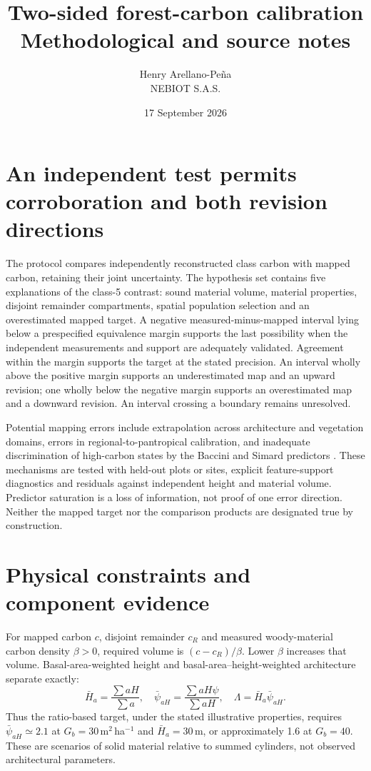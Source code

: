 \documentclass[11pt,a4paper]{article}
\title{Two-sided forest-carbon calibration\\[.4em]\large Methodological and source notes}
\author{Henry Arellano-Pe\~na\\NEBIOT S.A.S.}\date{17 September 2026}
\begin{document}
\maketitle
\section{An independent test permits corroboration and both revision directions}
The protocol compares independently reconstructed class carbon with mapped carbon, retaining their joint uncertainty. The hypothesis set contains five explanations of the class-5 contrast: sound material volume, material properties, disjoint remainder compartments, spatial population selection and an overestimated mapped target. A negative measured-minus-mapped interval lying below a prespecified equivalence margin supports the last possibility when the independent measurements and support are adequately validated. Agreement within the margin supports the target at the stated precision. An interval wholly above the positive margin supports an underestimated map and an upward revision; one wholly below the negative margin supports an overestimated map and a downward revision. An interval crossing a boundary remains unresolved.

Potential mapping errors include extrapolation across architecture and vegetation domains, errors in regional-to-pantropical calibration, and inadequate discrimination of high-carbon states by the Baccini and Simard predictors \citep{Arellano2016}. These mechanisms are tested with held-out plots or sites, explicit feature-support diagnostics and residuals against independent height and material volume. Predictor saturation is a loss of information, not proof of one error direction. Neither the mapped target nor the comparison products are designated true by construction.

\section{Physical constraints and component evidence}
For mapped carbon $c$, disjoint remainder $c_R$ and measured woody-material carbon density $\beta>0$, required volume is $(c-c_R)/\beta$. Lower $\beta$ increases that volume. Basal-area-weighted height and basal-area--height-weighted architecture separate exactly:
\[
\bar H_a=\frac{\sum aH}{\sum a},\quad
\bar\psi_{aH}=\frac{\sum aH\psi}{\sum aH},\quad
\Lambda=\bar H_a\bar\psi_{aH}.
\]
Thus the ratio-based target, under the stated illustrative properties, requires $\bar\psi_{aH}\simeq2.1$ at $G_b=30$\,m$^2$\,ha$^{-1}$ and $\bar H_a=30$\,m, or approximately 1.6 at $G_b=40$. These are scenarios of solid material relative to summed cylinders, not observed architectural parameters.
\end{document}
